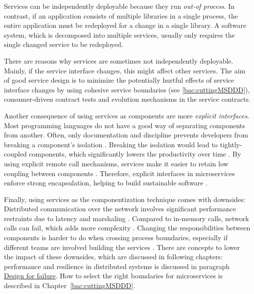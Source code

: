 Services can be independently deployable because they run \textit{out-of process}.
In contrast, if an application consists of multiple libraries in a single process, the entire application must be redeployed for a change in a single library.
A software system, which is decomposed into multiple services, usually only requires the single changed service to be redeployed.

There are reasons why services are sometimes not independently deployable.
Mainly, if the service interface changes, this might affect other services.
The aim of good service design is to minimize the potentially hurtful effects of service interface changes by using cohesive service boundaries (see \ref{bac:cuttingMSDDD}), consumer-driven contract tests \citep[p. 233]{Wolff2016} and evolution mechanisms in the service contracts.
\cite{FowlerComponentization2014}

Another consequence of using services as components are more \textit{explicit interfaces}.
Most programming languages do not have a good way of separating components from another.
Often, only documentation and discipline prevents developers from breaking a component's isolation \cite{FowlerComponentization2014}.
Breaking the isolation would lead to tightly-coupled components, which significantly lowers the productivity over time \citep[p. 3]{Wolff2016}.
By using explicit remote call mechanisms, services make it easier to retain low coupling between components \cite{FowlerComponentization2014}.
Therefore, explicit interfaces in microservices enforce strong encapsulation, helping to build sustainable software \citep[p. 3]{Wolff2016}.

Finally, using services as the componentization technique comes with downsides:
Distributed communication over the network involves significant performance restraints due to latency and marshaling \citep[p. 32]{Wolff2016}.
Compared to in-memory calls, network calls can fail, which adds more complexity \citep[p. 32]{Wolff2016}.
Changing the responsibilities between components is harder to do when crossing process boundaries, especially if different teams are involved building the services \cite{FowlerComponentization2014}.
There are concepts to lower the impact of these downsides, which are discussed in following chapters:
performance and resilience in distributed systems is discussed in paragraph \hyperref[bac:DesignForFailure]{Design for failure}.
How to select the right boundaries for microservices is described in Chapter~\ref{bac:cuttingMSDDD}.

